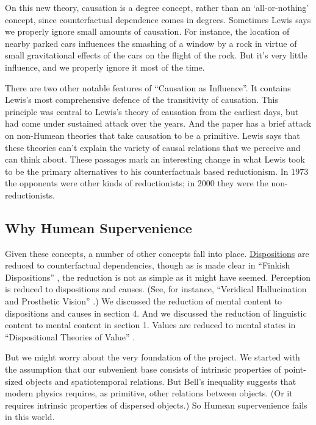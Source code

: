 On this new theory, causation is a degree concept, rather than an `all-or-nothing' concept, since counterfactual dependence comes in degrees. Sometimes Lewis says we properly ignore small amounts of causation. For instance, the location of nearby parked cars influences the smashing of a window by a rock in virtue of small gravitational effects of the cars on the flight of the rock. But it's very little influence, and we properly ignore it most of the time.

There are two other notable features of ``Causation as Influence''. It contains Lewis's most comprehensive defence of the transitivity of causation. This principle was central to Lewis's theory of causation from the earliest days, but had come under sustained attack over the years. And the paper has a brief attack on non-Humean theories that take causation to be a primitive. Lewis says that these theories can't explain the variety of causal relations that we perceive and can think about. These passages mark an interesting change in what Lewis took to be the primary alternatives to his counterfactuals based reductionism. In 1973 the opponents were other kinds of reductionists; in 2000 they were the non-reductionists.

\subsection{Why Humean Supervenience} 
Given these concepts, a number of other concepts fall into place. \href{http://plato.stanford.edu/dispositions/}{Dispositions} are reduced to counterfactual dependencies, though as is made clear in ``Finkish Dispositions'' \citeyearpar{Lewis1997b}, the reduction is not as simple as it might have seemed. Perception is reduced to dispositions and causes. (See, for instance, ``Veridical Hallucination and Prosthetic Vision'' \citeyearpar{Lewis1980d}.) We discussed the reduction of mental content to dispositions and causes in section 4. And we discussed the reduction of linguistic content to mental content in section 1. Values are reduced to mental states in ``Dispositional Theories of Value'' \citeyearpar{Lewis1989b}.

But we might worry about the very foundation of the project. We started with the assumption that our subvenient base consists of intrinsic properties of point-sized objects and spatiotemporal relations. But Bell's inequality suggests that modern physics requires, as primitive, other relations between objects. (Or it requires intrinsic properties of dispersed objects.) So Humean supervenience fails in this world.

